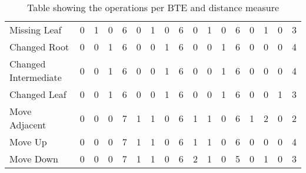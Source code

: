 \begin{table*}[b!]
{\begin{tabular}{lcccccccccccccccc}
          Missing Leaf         & 0                                    & 1                                        & 0                                      & 6                                       & 0      & 1   & 0      & 6     & 0      & 1   & 0      & 6     & 0      & 1   & 0      & 3     \\
          Changed Root         & 0                                    & 0                                        & 1                                      & 6                                       & 0      & 0   & 1      & 6     & 0      & 0   & 1      & 6     & 0      & 0   & 0      & 4     \\
          Changed Intermediate & 0                                    & 0                                        & 1                                      & 6                                       & 0      & 0   & 1      & 6     & 0      & 0   & 1      & 6     & 0      & 0   & 0      & 4     \\
          Changed Leaf         & 0                                    & 0                                        & 1                                      & 6                                       & 0      & 0   & 1      & 6     & 0      & 0   & 1      & 6     & 0      & 0   & 1      & 3     \\
          Move Adjacent        & 0                                    & 0                                        & 0                                      & 7                                       & 1      & 1   & 0      & 6     & 1      & 1   & 0      & 6     & 1      & 2   & 0      & 2     \\
          Move Up              & 0                                    & 0                                        & 0                                      & 7                                       & 1      & 1   & 0      & 6     & 1      & 1   & 0      & 6     & 0      & 0   & 0      & 4     \\
          Move Down            & 0                                    & 0                                        & 0                                      & 7                                       & 1      & 1   & 0      & 6     & 2      & 1   & 0      & 5     & 0      & 1   & 0      & 3     \\
          \bottomrule
      \end{tabular}

  }
\caption{Table showing the operations per BTE and distance measure}
\end{table*}





